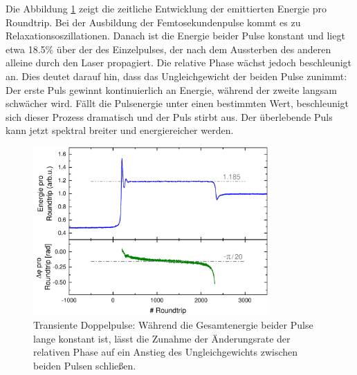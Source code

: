 \documentclass[bachelor,       %
               twoside,        %
               BCOR10mm,       %
               liststotoc,nomtotoc,bibtotoc, %
               english,ngerman, %
               final,          %
               ]{GAUBM}
\begin{document}
Die Abbildung \ref{fig:TransientSplittingAusw} zeigt die zeitliche Entwicklung der emittierten Energie pro Roundtrip.
Bei der Ausbildung der Femtosekundenpulse kommt es zu Relaxationsoszillationen.
Danach ist die Energie beider Pulse konstant und liegt etwa 18.5\% über der des Einzelpulses, der nach dem Aussterben des anderen alleine durch den Laser propagiert.
Die relative Phase wächst jedoch beschleunigt an.
Dies deutet darauf hin, dass das Ungleichgewicht der beiden Pulse zunimmt: Der erste Puls gewinnt kontinuierlich an Energie, während der zweite langsam schwächer wird.
Fällt die Pulsenergie unter einen bestimmten Wert, beschleunigt sich dieser Prozess dramatisch und der Puls stirbt aus.
Der überlebende Puls kann jetzt spektral breiter und energiereicher werden.
\begin{figure}[!htb]
	\centering
	\includegraphics[width=0.8\textwidth]{figures/TransientSplittingAusw}
	\caption{Transiente Doppelpulse: Während die Gesamtenergie beider Pulse lange konstant ist, lässt die Zunahme der Änderungsrate der relativen Phase auf ein Anstieg des Ungleichgewichts zwischen beiden Pulsen schließen.}
	\label{fig:TransientSplittingAusw}
\end{figure}

\clearpage
\end{document}
